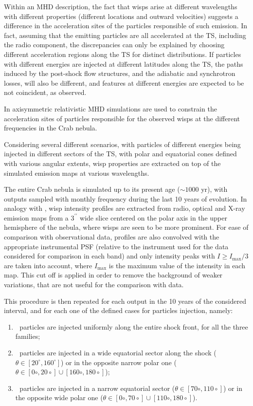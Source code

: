 Within an MHD description, the fact that wisps arise at different wavelengths with different properties (different locations and outward velocities) suggests a difference in the acceleration sites of the particles responsible of such emission.
In fact, assuming that the emitting particles are all accelerated at the TS, including the radio component, the discrepancies can only be explained by choosing different acceleration regions along the TS for distinct distributions. 
If particles with different energies are injected at different latitudes along the TS, the paths induced by the post-shock flow structures, and the adiabatic and synchrotron losses, will also be different, and features at different energies are expected to be not coincident, as observed.

In \citet{Olmi:2015} axisymmetric relativistic  MHD simulations are used to constrain the acceleration sites of particles responsible for the observed wisps at the different frequencies in the Crab nebula. 

Considering several different scenarios, with particles of different energies being injected in different sectors of the TS, with polar and equatorial cones defined with various angular extents, wisp properties are extracted on top of the simulated emission maps at various wavelengths.

The entire Crab nebula is simulated up to its present age ($\sim 1000$ yr), with outputs sampled with monthly frequency during the last 10 years of evolution. 
In analogy with \citet{Schweizer:2013}, wisp intensity profiles are extracted from radio, optical and X-ray emission maps from a $3^{\prime\prime}$ wide slice centered on the polar axis in the upper hemisphere of the nebula, where wisps are seen to be more prominent.
For ease of comparison with observational data, profiles are also convolved with the appropriate instrumental PSF (relative to the instrument used for the data considered for comparison in each band) and only intensity peaks with $I\geq I_\mathrm{max}/3$ are taken into account, where $I_\mathrm{max}$ is the maximum value of the intensity in each map. 
This cut off is applied in order to remove the background of weaker variations, that are not useful for the comparison with data. 

This procedure is then repeated for each output in the 10 years of the considered interval, and for each one of the defined cases for particles injection, namely:
\begin{enumerate}[(1)]
	\item  $\;$ particles are injected uniformly along the entire shock front, for all the three families;
	\item  $\;$ particles are injected in a wide equatorial sector along the shock ($\theta \in \left[ 20^\circ, 160^\circ \right]$) or in the opposite narrow polar one ($\theta \in \left[ 0\circ, 20\circ \right]\cup\left[ 160\circ, 180\circ \right]$);
	\item  $\;$ particles are injected in a narrow equatorial sector ($\theta \in \left[ 70\circ, 110\circ \right]$) or in the opposite wide polar one ($\theta \in \left[ 0\circ, 70\circ \right]\cup\left[ 110\circ, 180\circ \right]$).
\end{enumerate}

